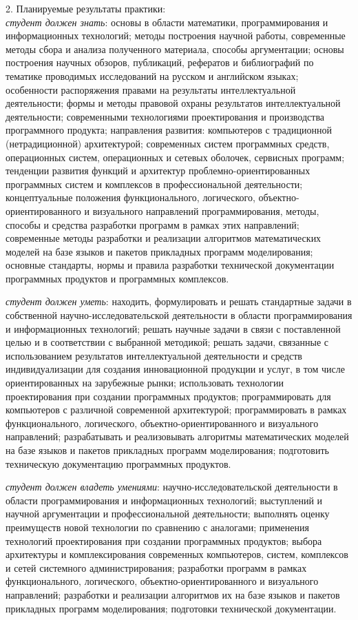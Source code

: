 \documentclass[12pt,a4paper]{scrartcl}
\begin{document}
		2. Планируемые результаты практики:\\
		\textit{студент должен знать}: основы в области математики, программирования и информационных технологий; методы построения научной работы, современные методы сбора и анализа полученного материала, способы аргументации; основы построения научных обзоров, публикаций, рефератов и библиографий по тематике проводимых исследований на русском и английском языках; особенности распоряжения правами на
результаты интеллектуальной деятельности; формы и методы правовой охраны результатов интеллектуальной деятельности; современными технологиями проектирования и производства программного продукта; направления развития: компьютеров с традиционной (нетрадиционной) архитектурой; современных систем программных средств, операционных систем, операционных и сетевых оболочек, сервисных программ; тенденции развития функций и архитектур проблемно-ориентированных программных систем и комплексов в профессиональной деятельности; концептуальные положения функционального, логического, объектно-ориентированного и визуального направлений программирования, методы, способы и средства разработки программ в рамках этих направлений; современные методы разработки и реализации алгоритмов математических моделей на базе языков и пакетов прикладных программ моделирования; основные стандарты, нормы и правила разработки технической документации программных продуктов и программных комплексов.


		\textit{студент должен уметь}: находить, формулировать и решать стандартные задачи в собственной научно-исследовательской деятельности в области программирования и информационных технологий; решать научные задачи в связи с поставленной целью и в соответствии с выбранной методикой; решать задачи, связанные с использованием
результатов интеллектуальной деятельности и средств индивидуализации для создания инновационной продукции и услуг, в том числе ориентированных на зарубежные рынки; использовать технологии проектирования при создании программных продуктов; программировать для компьютеров с различной современной архитектурой; программировать в рамках функционального, логического, объектно-ориентированного и визуального направлений; разрабатывать и реализовывать алгоритмы математических моделей на базе языков и пакетов прикладных программ моделирования; подготовить техническую документацию программных продуктов.


		\textit{студент должен владеть умениями}: научно-исследовательской деятельности в области
программирования и информационных технологий; выступлений и научной
аргументации и профессиональной деятельности; выполнять оценку преимуществ новой
технологии по сравнению с аналогами; применения технологий проектирования при создании программных продуктов; выбора архитектуры и комплексирования современных компьютеров, систем, комплексов и сетей системного администрирования; разработки программ в рамках функционального, логического, объектно-ориентированного и визуального направлений; разработки и реализации алгоритмов их на базе языков и пакетов прикладных программ моделирования; подготовки технической документации.
\end{document}
